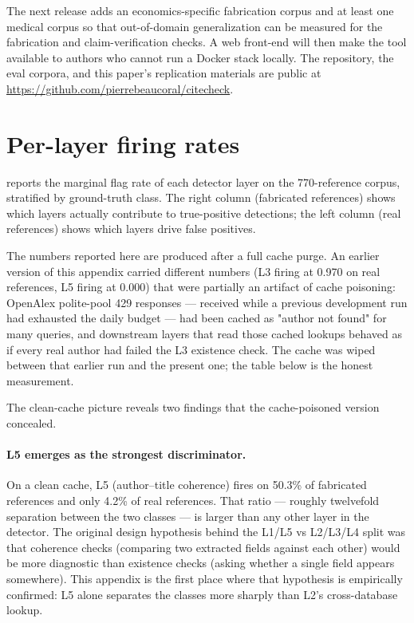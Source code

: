 \documentclass[12pt]{article}
\begin{document}
The next release adds an economics-specific fabrication corpus and at least one medical corpus so that out-of-domain generalization can be measured for the fabrication and claim-verification checks. A web front-end will then make the tool available to authors who cannot run a Docker stack locally. The repository, the eval corpora, and this paper's replication materials are public at \url{https://github.com/pierrebeaucoral/citecheck}.

\printbibliography

\newpage
\appendix

\section{Per-layer firing rates}\label{app:per-layer}

 reports the marginal flag rate of each detector layer on the 770-reference corpus, stratified by ground-truth class. The right column (fabricated references) shows which layers actually contribute to true-positive detections; the left column (real references) shows which layers drive false positives.

The numbers reported here are produced after a full cache purge. An earlier version of this appendix carried different numbers (L3 firing at 0.970 on real references, L5 firing at 0.000) that were partially an artifact of cache poisoning: OpenAlex polite-pool 429 responses --- received while a previous development run had exhausted the daily budget --- had been cached as "author not found" for many queries, and downstream layers that read those cached lookups behaved as if every real author had failed the L3 existence check. The cache was wiped between that earlier run and the present one; the table below is the honest measurement.

The clean-cache picture reveals two findings that the cache-poisoned version concealed.

\paragraph{L5 emerges as the strongest discriminator.} On a clean cache, L5 (author--title coherence) fires on 50.3\% of fabricated references and only 4.2\% of real references. That ratio --- roughly twelvefold separation between the two classes --- is larger than any other layer in the detector. The original design hypothesis behind the L1/L5 vs L2/L3/L4 split was that coherence checks (comparing two extracted fields against each other) would be more diagnostic than existence checks (asking whether a single field appears somewhere). This appendix is the first place where that hypothesis is empirically confirmed: L5 alone separates the classes more sharply than L2's cross-database lookup.
\end{document}
